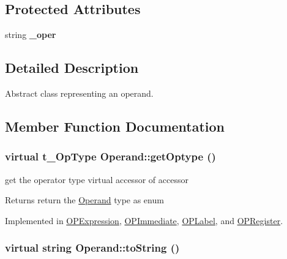 \subsection*{Protected Attributes}
\begin{DoxyCompactItemize}
\item 
\hypertarget{classOperand_af70a183445064a0106d41dfeea681790}{
string {\bfseries \_\-oper}}
\label{classOperand_af70a183445064a0106d41dfeea681790}

\end{DoxyCompactItemize}


\subsection{Detailed Description}
Abstract class representing an operand. 

\subsection{Member Function Documentation}
\hypertarget{classOperand_af4bd7dab87bfd7f3c17ea84f07b02b69}{
\subsubsection[{getOptype}]{\setlength{\rightskip}{0pt plus 5cm}virtual t\_\-OpType Operand::getOptype ()}}
\label{classOperand_af4bd7dab87bfd7f3c17ea84f07b02b69}


get the operator type virtual accessor of accessor \begin{DoxyReturn}{Returns}
return the \hyperlink{classOperand}{Operand} type as enum 
\end{DoxyReturn}


Implemented in \hyperlink{classOPExpression_a26efe8d14f0d37157c885ff16988be30}{OPExpression}, \hyperlink{classOPImmediate_af637aedc23b19948b3b2a3de80b730e7}{OPImmediate}, \hyperlink{classOPLabel_a840489088fc49c57b02264089ec4c55b}{OPLabel}, and \hyperlink{classOPRegister_a06690941f531390e7d71526244c0812b}{OPRegister}.\hypertarget{classOperand_aaa9879d6c4fb8334c1b4d97dad614cef}{
\subsubsection[{toString}]{\setlength{\rightskip}{0pt plus 5cm}virtual string Operand::toString ()}}
\label{classOperand_aaa9879d6c4fb8334c1b4d97dad614cef}


